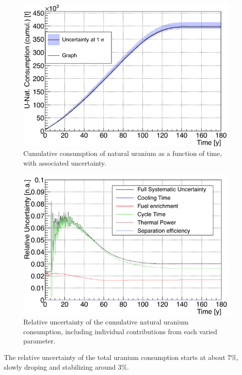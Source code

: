 \documentclass{anstrans}
\begin{document}
\begin{figure}[t] %
    \centering
    \includegraphics[scale=0.3]{unat_full}
    \caption{Cumulative consumption of natural uranium as a function of time, with
      associated uncertainty.}\label{fig:unat_full}
\end{figure}


\begin{figure}[t] %
    \centering
    \includegraphics[scale=0.3]{unat_uncer}
    \caption{Relative uncertainty of the cumulative natural uranium consumption, including
      individual contributions from each varied parameter.}\label{fig:unatr_uncer}
\end{figure}

The relative uncertainty of the total uranium consumption starts at about
$7\%$, slowly droping and stabilizing around $3\%$.
\end{document}
